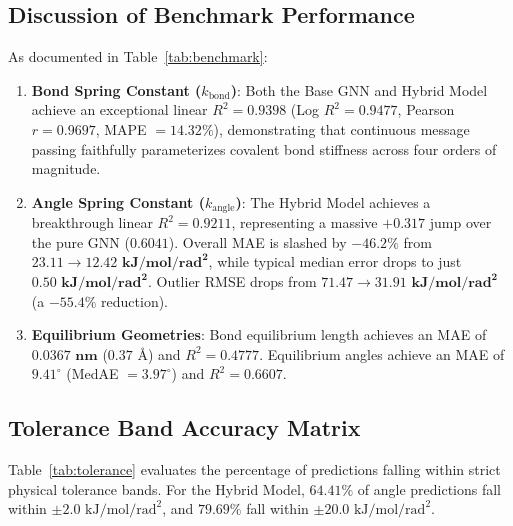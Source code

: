 \documentclass[11pt,a4paper]{article}
\begin{document}
\subsection{Discussion of Benchmark Performance}
As documented in Table~\ref{tab:benchmark}:
\begin{enumerate}
    \item \textbf{Bond Spring Constant ($k_{\text{bond}}$)}: Both the Base GNN and Hybrid Model achieve an exceptional linear $R^2 = \mathbf{0.9398}$ (Log $R^2 = \mathbf{0.9477}$, Pearson $r = \mathbf{0.9697}$, MAPE $= 14.32\%$), demonstrating that continuous message passing faithfully parameterizes covalent bond stiffness across four orders of magnitude.
    \item \textbf{Angle Spring Constant ($k_{\text{angle}}$)}: The Hybrid Model achieves a breakthrough linear $R^2 = \mathbf{0.9211}$, representing a massive $\mathbf{+0.317}$ jump over the pure GNN ($0.6041$). Overall MAE is slashed by $\mathbf{-46.2\%}$ from $23.11 \to \mathbf{12.42\text{ kJ/mol/rad}^2}$, while typical median error drops to just $\mathbf{0.50\text{ kJ/mol/rad}^2}$. Outlier RMSE drops from $71.47 \to \mathbf{31.91\text{ kJ/mol/rad}^2}$ (a $\mathbf{-55.4\%}$ reduction).
    \item \textbf{Equilibrium Geometries}: Bond equilibrium length achieves an MAE of $\mathbf{0.0367\text{ nm}}$ ($0.37\text{ \AA}$) and $R^2 = 0.4777$. Equilibrium angles achieve an MAE of $\mathbf{9.41^\circ}$ (MedAE $= 3.97^\circ$) and $R^2 = 0.6607$.
\end{enumerate}

\subsection{Tolerance Band Accuracy Matrix}
Table~\ref{tab:tolerance} evaluates the percentage of predictions falling within strict physical tolerance bands. For the Hybrid Model, $\mathbf{64.41\%}$ of angle predictions fall within $\pm 2.0\text{ kJ/mol/rad}^2$, and $\mathbf{79.69\%}$ fall within $\pm 20.0\text{ kJ/mol/rad}^2$.
\end{document}
